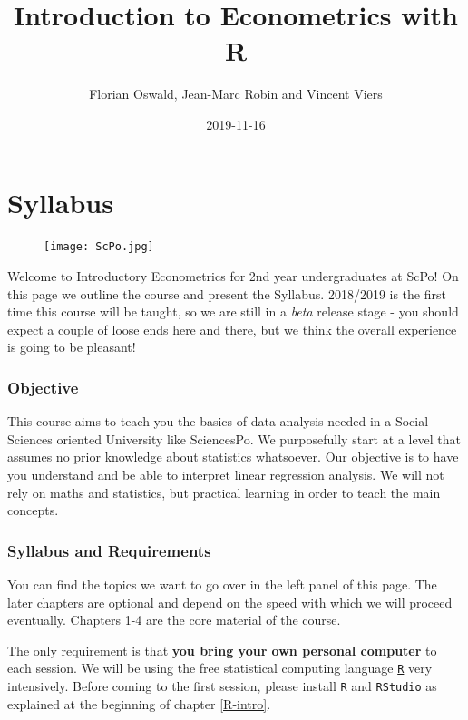 \documentclass[]{book}
\title{Introduction to Econometrics with R}
\author{Florian Oswald, Jean-Marc Robin and Vincent Viers}
\date{2019-11-16}
\begin{document}
\maketitle

{
\setcounter{tocdepth}{1}
\tableofcontents
}
\chapter*{Syllabus}\label{syllabus}

\begin{figure}
\centering
\texttt{[image: ScPo.jpg]}
\caption{}
\end{figure}

Welcome to Introductory Econometrics for 2nd year undergraduates at
ScPo! On this page we outline the course and present the Syllabus.
2018/2019 is the first time this course will be taught, so we are still
in a \emph{beta} release stage - you should expect a couple of loose
ends here and there, but we think the overall experience is going to be
pleasant!

\subsection*{Objective}\label{objective}

This course aims to teach you the basics of data analysis needed in a
Social Sciences oriented University like SciencesPo. We purposefully
start at a level that assumes no prior knowledge about statistics
whatsoever. Our objective is to have you understand and be able to
interpret linear regression analysis. We will not rely on maths and
statistics, but practical learning in order to teach the main concepts.

\subsection*{Syllabus and Requirements}\label{syllabus-and-requirements}

You can find the topics we want to go over in the left panel of this
page. The later chapters are optional and depend on the speed with which
we will proceed eventually. Chapters 1-4 are the core material of the
course.

The only requirement is that \textbf{you bring your own personal
computer} to each session. We will be using the free statistical
computing language \href{https://www.r-project.org}{\texttt{R}} very
intensively. Before coming to the first session, please install
\texttt{R} and \texttt{RStudio} as explained at the beginning of chapter
\ref{R-intro}.
\end{document}
